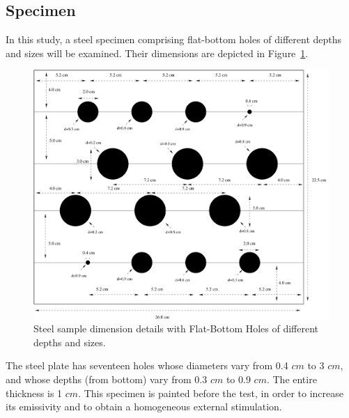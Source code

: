 \documentclass[]{spie}  %
\begin{document}
\subsection{Specimen} %
\label{sub:specimen}
In this study, a steel specimen comprising flat-bottom holes of different depths and sizes will be examined. Their dimensions are depicted in Figure~\ref{specimen}.
   \begin{figure}[ht]
   \centering   
   \includegraphics[scale=0.4]{graph/specimen_schema.pdf}
   \caption{Steel sample dimension details with Flat-Bottom Holes of different depths and sizes.}
    \label{specimen} 
   \end{figure}  

The steel plate has seventeen holes whose diameters vary from 0.4 $cm$  to 3 $cm$, and whose depths (from bottom) vary from 0.3 $cm$ to 0.9 $cm$. The entire thickness is 1 $cm$. This specimen is painted before the test, in order to increase its emissivity and to obtain a homogeneous external stimulation.

\end{document}
